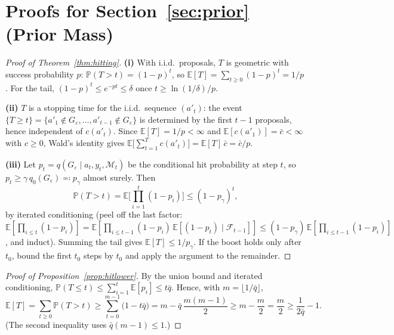 \documentclass{article}
\theoremstyle{plain}
\theoremstyle{definition}
\theoremstyle{remark}
\newcommand{\M}{\mathcal{M}}
\newcommand{\E}{\mathbb{E}}
\renewcommand{\P}{\mathbb{P}}
\newcommand{\eps}{\varepsilon}
\begin{document}



\newpage
\appendix

\section{Proofs for Section~\ref{sec:prior} (Prior Mass)}
\label{app:prior}

\begin{proof}[Proof of Theorem~\ref{thm:hitting}]
\textbf{(i)} With i.i.d.\ proposals, $T$ is geometric with success probability $p$: $\P(T > t) = (1-p)^t$, so $\E[T] = \sum_{t \ge 0} (1-p)^t = 1/p$. For the tail, $(1-p)^t \le e^{-pt} \le \delta$ once $t \ge \ln(1/\delta)/p$.

\textbf{(ii)} $T$ is a stopping time for the i.i.d.\ sequence $(a'_t)$: the event $\{T \ge t\} = \{a'_1 \notin G_\eps, \dots, a'_{t-1} \notin G_\eps\}$ is determined by the first $t-1$ proposals, hence independent of $c(a'_t)$. Since $\E[T] = 1/p < \infty$ and $\E[c(a'_1)] = \bar{c} < \infty$ with $c \ge 0$, Wald's identity \citep{wald1944cumulative} gives $\E\big[\sum_{t=1}^{T} c(a'_t)\big] = \E[T]\, \bar{c} = \bar{c}/p$.

\textbf{(iii)} Let $p_t = q(G_\eps \mid a_t, y_t, \M_t)$ be the conditional hit probability at step $t$, so $p_t \ge \gamma\, q_0(G_\eps) \eqqcolon p_\gamma$ almost surely. Then
\[
\P(T > t) = \E\Big[\textstyle\prod_{i=1}^{t} (1 - p_i)\Big] \le (1 - p_\gamma)^t ,
\]
by iterated conditioning (peel off the last factor: $\E[\prod_{i \le t}(1-p_i)] = \E[\prod_{i \le t-1}(1-p_i)\,\E[(1-p_t) \mid \mathcal{F}_{t-1}]] \le (1-p_\gamma)\,\E[\prod_{i \le t-1}(1-p_i)]$, and induct). Summing the tail gives $\E[T] \le 1/p_\gamma$. If the boost holds only after $t_0$, bound the first $t_0$ steps by $t_0$ and apply the argument to the remainder.
\end{proof}

\begin{proof}[Proof of Proposition~\ref{prop:hitlower}]
By the union bound and iterated conditioning, $\P(T \le t) \le \sum_{i=1}^{t} \E[p_i] \le t \bar{q}$. Hence, with $m = \lfloor 1/\bar{q} \rfloor$,
\[
\E[T] = \sum_{t \ge 0} \P(T > t) \ge \sum_{t=0}^{m-1} \big(1 - t\bar{q}\big)
= m - \bar{q}\,\frac{m(m-1)}{2} \ge m - \frac{m}{2} = \frac{m}{2} \ge \frac{1}{2\bar{q}} - 1 .
\]
(The second inequality uses $\bar q (m-1) \le 1$.)
\end{proof}
\end{document}
